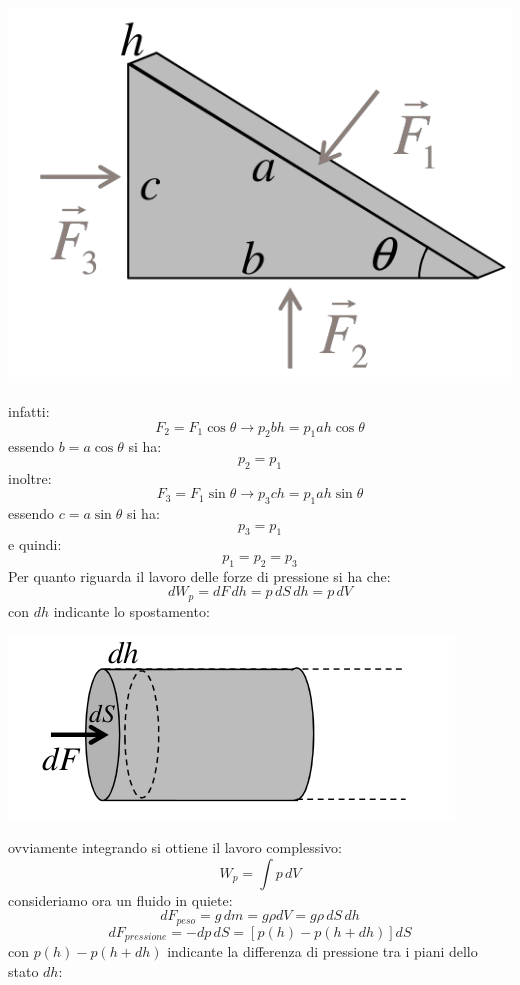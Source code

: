 \documentclass[a4paper,12pt, oneside]{book}
\begin{document}
\begin{center}
	\includegraphics[scale=0.5]{img/flu.png}
\end{center}
infatti:
$$F_2=F_1\cos \theta\to p_2bh=p_1ah\cos\theta$$
essendo $b=a\cos\theta$ si ha:
$$p_2=p_1$$
inoltre:
$$F_3=F_1\sin \theta\to p_3ch=p_1ah\sin\theta$$
essendo $c=a\sin\theta$ si ha:
$$p_3=p_1$$
e quindi:
$$p_1=p_2=p_3$$
Per quanto riguarda il lavoro delle forze di pressione si ha che:
$$dW_p=dF\,dh=p\,dS\,dh=p\,dV$$
con $dh$ indicante lo spostamento:
\begin{center}
	\includegraphics[scale=0.5]{img/flu2.png}
\end{center}
ovviamente integrando si ottiene il lavoro complessivo:
$$W_p=\int p\,dV$$
\newpage
consideriamo ora un fluido in quiete:
$$dF_{peso}=g\,dm=g\rho dV=g\rho \,dS\,dh$$
$$dF_{pressione}=-dp\,dS=[p(h)-p(h+dh)]dS$$
con $p(h)-p(h+dh)$ indicante la differenza di pressione tra i piani dello stato $dh$:
\end{document}
